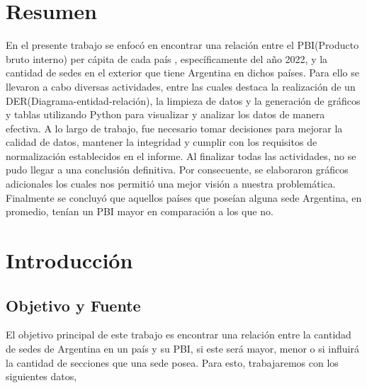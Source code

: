 \documentclass[10pt,a4paper]{article}
\begin{document}

\maketitle

\restoregeometry


\section{Resumen} \vspace{0.3cm}

En el presente trabajo se enfocó en encontrar  una relación entre el PBI(Producto bruto interno) per cápita de cada país , específicamente del año 2022, y la cantidad de sedes en el exterior que tiene Argentina en dichos países.
Para ello se llevaron a cabo diversas actividades, entre las cuales destaca la realización de un  DER(Diagrama-entidad-relación), la limpieza de datos  y  la generación de gráficos y tablas utilizando Python para visualizar y analizar los datos de manera efectiva. A lo largo de trabajo, fue necesario tomar decisiones para mejorar la calidad de datos, mantener la integridad y cumplir con los requisitos de normalización establecidos en el informe. 
Al finalizar todas las actividades, no se pudo llegar a  una conclusión definitiva. Por consecuente, se elaboraron gráficos adicionales los cuales  nos permitió una mejor visión a nuestra problemática. Finalmente  se  concluyó que  aquellos países que poseían alguna sede Argentina, en promedio, tenían  un PBI mayor en comparación a los que no. 


\section{Introducción} \vspace{0.1cm}

\subsection{Objetivo y Fuente} \vspace{0.3cm}

El objetivo principal de este trabajo es encontrar una relación entre la cantidad de sedes de Argentina en un país y su PBI, si este será mayor, menor o si influirá la cantidad de secciones que una sede posea.  Para esto, trabajaremos con los siguientes datos, 
\end{document}
